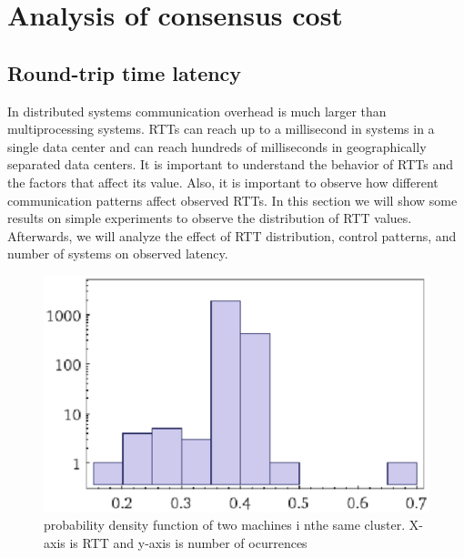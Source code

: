 \section{Analysis of consensus cost}\label{sec:analysis}


\subsection{Round-trip time latency}
In distributed systems communication overhead is much larger than multiprocessing systems. RTTs can reach up to a millisecond in systems in a single data center and can reach hundreds of milliseconds in geographically separated data centers. It is important to understand the behavior of RTTs and the factors that affect its value. Also, it is important to observe how different communication patterns affect observed RTTs. In this section we will show some results on simple experiments to observe the distribution of RTT values. Afterwards, we will analyze the effect of RTT distribution, control patterns, and number of systems on observed latency.

\begin{figure}[h]
\centering
\includegraphics[scale=0.5]{img/rttpdf2.eps}
\caption{probability density function of two machines i nthe same cluster. X-axis is RTT and y-axis is number of ocurrences}
\label{fig:rttpdf}
\end{figure}

